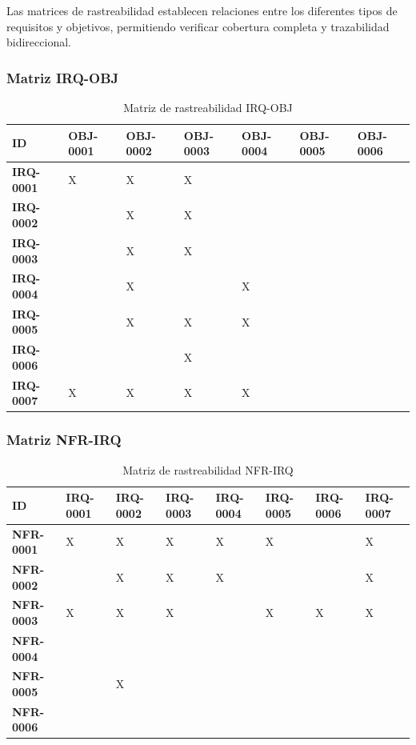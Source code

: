 Las matrices de rastreabilidad establecen relaciones entre los diferentes tipos de requisitos y objetivos, permitiendo verificar cobertura completa y trazabilidad bidireccional.

\subsubsection{Matriz IRQ-OBJ}

\begin{table}[H]
\centering
\small
\begin{tabular}{|p{2.2cm}|p{2.0cm}|p{2.0cm}|p{2.0cm}|p{2.0cm}|p{2.0cm}|p{2.0cm}|}
\hline
\textbf{ID} & \textbf{OBJ-0001} & \textbf{OBJ-0002} & \textbf{OBJ-0003} & \textbf{OBJ-0004} & \textbf{OBJ-0005} & \textbf{OBJ-0006} \\
\hline
\hline
\textbf{IRQ-0001} & X & X & X & & & \\
\hline
\textbf{IRQ-0002} & & X & X & & & \\
\hline
\textbf{IRQ-0003} & & X & X & & & \\
\hline
\textbf{IRQ-0004} & & X & & X & & \\
\hline
\textbf{IRQ-0005} & & X & X & X & & \\
\hline
\textbf{IRQ-0006} & & & X & & & \\
\hline
\textbf{IRQ-0007} & X & X & X & X & & \\
\hline
\end{tabular}
\caption{Matriz de rastreabilidad IRQ-OBJ}
\label{tab:matriz-irq-obj}
\end{table}

\subsubsection{Matriz NFR-IRQ}

\begin{table}[H]
\centering
\small
\begin{tabular}{|p{2.2cm}|p{1.9cm}|p{1.9cm}|p{1.9cm}|p{1.9cm}|p{1.9cm}|p{1.9cm}|p{1.9cm}|}
\hline
\textbf{ID} & \textbf{IRQ-0001} & \textbf{IRQ-0002} & \textbf{IRQ-0003} & \textbf{IRQ-0004} & \textbf{IRQ-0005} & \textbf{IRQ-0006} & \textbf{IRQ-0007} \\
\hline
\hline
\textbf{NFR-0001} & X & X & X & X & X & & X \\
\hline
\textbf{NFR-0002} & & X & X & X & & & X \\
\hline
\textbf{NFR-0003} & X & X & X & & X & X & X \\
\hline
\textbf{NFR-0004} & & & & & & & \\
\hline
\textbf{NFR-0005} & & X & & & & & \\
\hline
\textbf{NFR-0006} & & & & & & & \\
\hline
\end{tabular}
\caption{Matriz de rastreabilidad NFR-IRQ}
\label{tab:matriz-nfr-irq}
\end{table}

